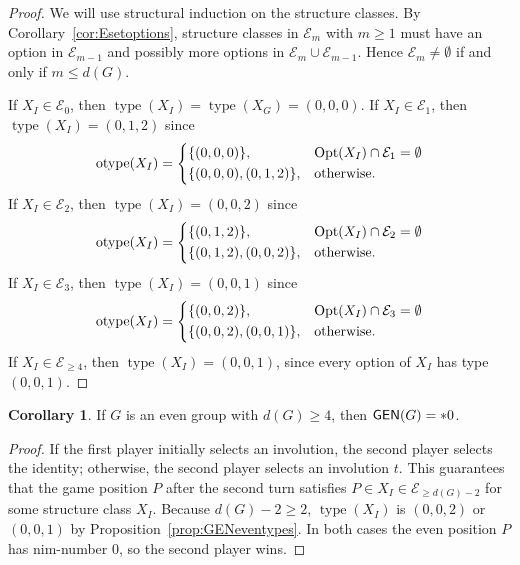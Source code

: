 \documentclass[12pt]{amsart}
\theoremstyle{definition}
\newtheorem{corollary}[equation]{Corollary}
\theoremstyle{definition}
\numberwithin{equation}{section}
\begin{document}
\begin{proof}
We will use structural induction on the structure classes.
By Corollary~\ref{cor:Esetoptions}, structure classes in $\mathcal{E}_m$ with $m \geq 1$ must have an option in $\mathcal{E}_{m-1}$ and possibly more options 
in $\mathcal{E}_{m}\cup\mathcal{E}_{m-1}$.
Hence $\mathcal{E}_m\ne\emptyset$ if and only if $m\le {d}(G)$.

If $X_I \in \mathcal{E}_0$, then ${\operatorname{type}}(X_I)={\operatorname{type}}(X_G)=(0,0,0)$.
If $X_I \in \mathcal{E}_1$, then ${\operatorname{type}}(X_I)=(0,1,2)$ since
\[
{\operatorname{otype}}(X_I)=
\begin{dcases}
\{(0,0,0)\}, & {\operatorname{Opt}}(X_I)\cap\mathcal{E}_1=\emptyset\\
\{(0,0,0),(0,1,2)\}, & \text{otherwise.} 
\end{dcases}
\]
If $X_I \in \mathcal{E}_2$, then ${\operatorname{type}}(X_I)=(0,0,2)$ since
\[
{\operatorname{otype}}(X_I)=
\begin{dcases}
\{(0,1,2)\}, & {\operatorname{Opt}}(X_I)\cap\mathcal{E}_2=\emptyset\\
\{(0,1,2),(0,0,2)\}, & \text{otherwise.} 
\end{dcases}
\]
If $X_I  \in \mathcal{E}_{3}$, then ${\operatorname{type}}(X_I)=(0,0,1)$ since
\[
{\operatorname{otype}}(X_I)=
\begin{dcases}
\{(0,0,2)\}, & {\operatorname{Opt}}(X_I)\cap\mathcal{E}_3=\emptyset\\
\{(0,0,2),(0,0,1)\}, & \text{otherwise.} 
\end{dcases}
\]
If $X_I \in \mathcal{E}_{\geq 4}$, then ${\operatorname{type}}(X_I)=(0,0,1)$, since every option of $X_I$ has type $(0,0,1)$.
\end{proof}

\begin{corollary}\label{cor:dgt4}
If $G$ is an even group with ${d}(G) \geq 4$, then ${\text{\sf GEN}}(G)=*0$.
\end{corollary}
\begin{proof}
If the first player initially selects an involution, the second player selects the identity; otherwise, the second player selects an involution $t$.  This guarantees that the game position $P$ after the second turn satisfies 
$P\in X_I\in\mathcal{E}_{\ge d(G)-2}$ for some structure class $X_I$. Because $d(G)-2 \ge 2$, ${\operatorname{type}}(X_I)$ is $(0,0,2)$ or $(0,0,1)$ by Proposition~\ref{prop:GENeventypes}.
In both cases the even position $P$ has nim-number $0$, so the second player wins.
\end{proof}
\end{document}
